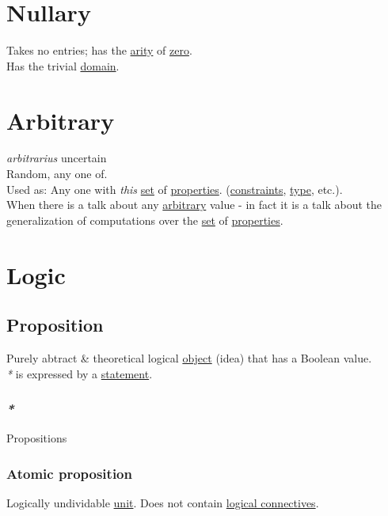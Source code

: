 \documentclass[a4paper,14pt,oneside]{book}
\begin{document}
\chapter{\label{org130c209}Nullary}
\label{sec:org837ba56}
Takes no entries; has the \hyperref[org7302783]{arity} of \hyperref[org9629e67]{zero}.\\
Has the trivial \hyperref[orge94fc58]{domain}.\\

\chapter{\label{org9414006}Arbitrary}
\label{sec:org914db0b}
\emph{arbitrarius} uncertain\\

Random, any one of.\\

Used as: Any one with \emph{this} \hyperref[org0f7f8fa]{set} of \hyperref[orgbcfea7d]{properties}. (\hyperref[orga719142]{constraints}, \hyperref[orgc4a7610]{type}, etc.).\\

When there is a talk about any \hyperref[org9414006]{arbitrary} value - in fact it is a talk about the generalization of computations over the \hyperref[org0f7f8fa]{set} of \hyperref[orgbcfea7d]{properties}.\\

\chapter{Logic}
\label{sec:org09ebf58}
\section{\label{orgb180614}Proposition}
\label{sec:org5d4ebcb}
Purely abtract \& theoretical logical \hyperref[orgef6fa9d]{object} (idea) that has a Boolean value.\\

\emph{*} is expressed by a \hyperref[orgcb721a9]{statement}.\\

\subsection{\emph{*}}
\label{sec:org3ec2039}

\label{org1fdbb0f}Propositions\\

\subsection{\label{orga5a7656}Atomic proposition}
\label{sec:org5914127}
Logically undividable \hyperref[orga4edbd5]{unit}. Does not contain \hyperref[org8b50731]{logical connectives}.\\
\end{document}
